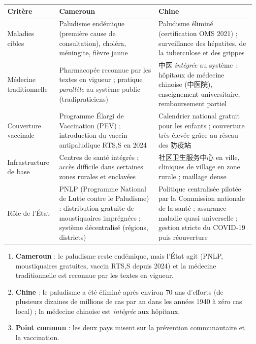 \documentclass[11pt]{article}
\newcommand{\cle}[1]{{\popxbold\color{popdark}#1}}
\begin{document}
\begin{center}
\begin{tabularx}{\linewidth}{|X|X|X|}
\hline
\rowcolor{popblueL} Critère & Cameroun & Chine \\
\hline
Maladies cibles & Paludisme endémique (première cause de consultation), choléra, méningite, fièvre jaune & Paludisme éliminé (certification OMS 2021) ; surveillance des hépatites, de la tuberculose et des grippes \\
\hline
Médecine traditionnelle & Pharmacopée reconnue par les textes en vigueur ; pratique \emph{parallèle} au système public (tradipraticiens) & 中医 \emph{intégrée} au système : hôpitaux de médecine chinoise (中医院), enseignement universitaire, remboursement partiel \\
\hline
Couverture vaccinale & Programme Élargi de Vaccination (PEV) ; introduction du vaccin antipaludique RTS,S en 2024 & Calendrier national gratuit pour les enfants ; couverture très élevée grâce au réseau des 防疫站 \\
\hline
Infrastructure de base & Centres de santé intégrés ; accès difficile dans certaines zones rurales et enclavées & 社区卫生服务中心 en ville, cliniques de village en zone rurale ; maillage dense \\
\hline
Rôle de l'État & PNLP (Programme National de Lutte contre le Paludisme) : distribution gratuite de moustiquaires imprégnées ; système décentralisé (régions, districts) & Politique centralisée pilotée par la Commission nationale de la santé ; assurance maladie quasi universelle ; gestion stricte du COVID-19 puis réouverture \\
\hline
\end{tabularx}
\end{center}

\begin{aretenir}
\begin{enumerate}
\item \textbf{Cameroun} : le paludisme reste endémique, mais l'État agit (PNLP, moustiquaires gratuites, vaccin RTS,S depuis 2024) et la médecine traditionnelle est reconnue par les textes en vigueur.
\item \textbf{Chine} : le paludisme a été éliminé après environ 70 ans d'efforts (de plusieurs dizaines de millions de cas par an dans les années 1940 à zéro cas local) ; la médecine chinoise est \emph{intégrée} aux hôpitaux.
\item \textbf{Point commun} : les deux pays misent sur la \cle{prévention communautaire} et la \cle{vaccination}.
\end{enumerate}
\end{aretenir}
\end{document}
